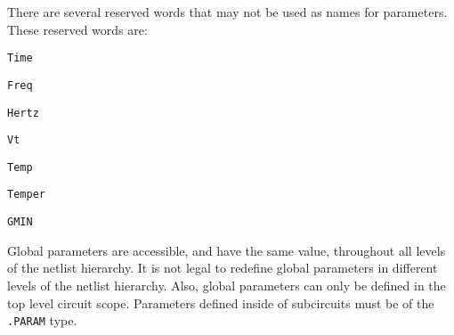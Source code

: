 \begin{Command}
There are several reserved words that may not be used as names for parameters.  These reserved words are:
\begin{XyceItemize}
\item \verb+Time+
\item \verb+Freq+ 
\item \verb+Hertz+ 
\item \verb+Vt+
\item \verb+Temp+
\item \verb+Temper+
\item \verb+GMIN+
\end{XyceItemize}

Global parameters are accessible, and have the same value, throughout all
levels of the netlist hierarchy.  It is not legal to redefine global parameters
in different levels of the netlist hierarchy.  Also, global parameters can only 
  be defined in the top level circuit scope.   Parameters defined inside of 
  subcircuits must be of the \texttt{.PARAM} type.

\end{Command}
